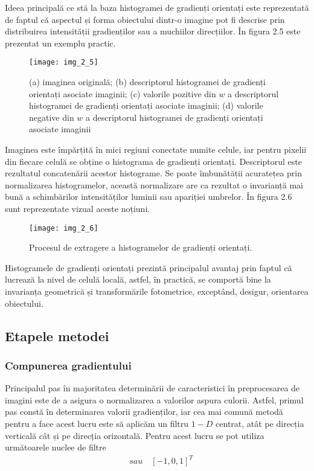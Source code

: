 Ideea principală ce stă la baza histogramei de gradienți orientați este reprezentată de faptul că aspectul și forma obiectului dintr-o imagine pot fi descrise prin distribuirea intensității gradienților  sau a muchiilor direcțiilor. În figura 2.5 este prezentat un exemplu practic.
\begin{figure}[!h]
	\centering
	\texttt{[image: img\_2\_5]}
	\caption[Descriptor HOG]{(a) imaginea originală; (b) descriptorul histogramei de gradienți orientați asociate imaginii; (c) valorile pozitive din $w$ a descriptorul histogramei de gradienți orientați asociate imaginii; (d) valorile negative din $w$ a descriptorul histogramei de gradienți orientați asociate imaginii}
\end{figure}

Imaginea este împărțită în mici regiuni conectate numite celule, iar pentru pixelii din fiecare celulă se obține o histograma de gradienți orientați. Descriptorul este rezultatul concatenării acestor histograme. Se poate îmbunătății acuratețea prin normalizarea histogramelor, această normalizare are ca rezultat o invarianță mai bună a schimbărilor intensităților luminii sau apariției umbrelor. În figura 2.6 sunt reprezentate vizual aceste noțiuni.
\begin{figure}[!h]
	\centering
	\texttt{[image: img\_2\_6]}
	\caption{Procesul de extragere a histogramelor de gradienți orientați.}
\end{figure}

Histogramele de gradienți orientați prezintă principalul avantaj prin faptul că lucrează la nivel de celulă locală, astfel, în practică, se comportă bine la invarianța geometrică și transformările fotometrice, exceptând, desigur, orientarea obiectului.

\subsection{Etapele metodei}

\subsubsection {Compunerea gradientului}

Principalul pas în majoritatea determinării de caracteristici în preprocesarea de imagini este de a asigura o normalizarea a valorilor aspura culorii. Astfel, primul pas constă în determinarea valorii gradienților, iar cea mai comună metodă pentru a face acest lucru este să aplicăm un filtru $1-D$ centrat, atât pe direcția verticală cât și pe direcția orizontală. Pentru acest lucru se pot utiliza următoarele nuclee de filtre
\begin{align}	
	[-1, 0, 1]  \quad sau  \quad  [-1, 0, 1]^T
\end{align}

